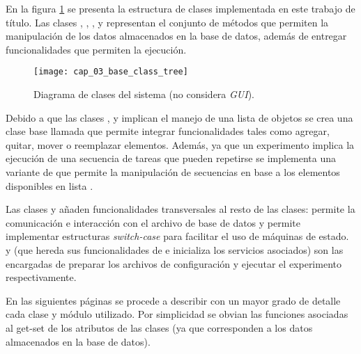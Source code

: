 \documentclass[\main/main.tex]{subfiles}
\begin{document}
			En la figura \ref{fig:03_base_class_tree} se presenta la estructura de clases implementada en este trabajo de título. Las clases , , ,  y  representan el conjunto de métodos que permiten la manipulación de los datos almacenados en la base de datos, además de entregar funcionalidades que permiten la ejecución. 
			\begin{figure}[H]
				\centering
				\texttt{[image: cap\_03\_base\_class\_tree]}
				\caption{Diagrama de clases del sistema (no considera \textit{GUI}).}
				\label{fig:03_base_class_tree}
			\end{figure} 

			Debido a que las clases ,  y  implican el manejo de una lista de objetos se crea una clase base llamada  que permite integrar funcionalidades tales como agregar, quitar, mover o reemplazar elementos. Además, ya que un experimento implica la ejecución de una secuencia de tareas que pueden repetirse se implementa una variante de  que permite la manipulación de secuencias en base a los elementos disponibles en lista .

			Las clases  y  añaden funcionalidades transversales al resto de las clases:  permite la comunicación e interacción con el archivo de base de datos y  permite implementar estructuras \textit{switch-case} para facilitar el uso de máquinas de estado.  y  (que hereda sus funcionalidades de  e inicializa los servicios asociados) son las encargadas de preparar los archivos de configuración y ejecutar el experimento respectivamente.   

			En las siguientes páginas se procede a describir con un mayor grado de detalle cada clase y módulo utilizado. Por simplicidad se obvian las funciones asociadas al get-set de los atributos de las clases (ya que corresponden a los datos almacenados en la base de datos).
			
\end{document}
